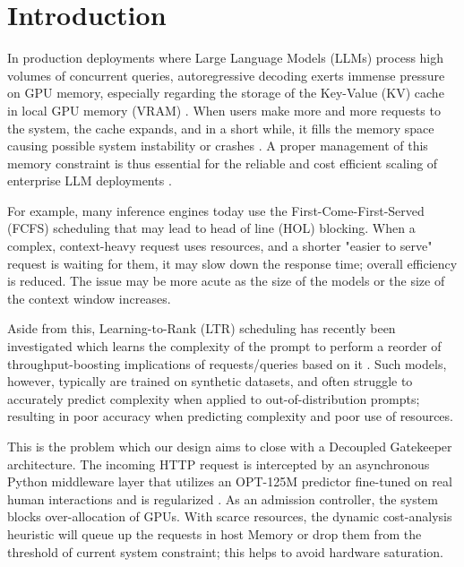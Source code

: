 \documentclass[conference]{IEEEtran}
\begin{document}
\section{Introduction}
In production deployments where Large Language Models (LLMs) process high volumes of concurrent queries, autoregressive decoding exerts immense pressure on GPU memory, especially regarding the storage of the Key-Value (KV) cache in local GPU memory (VRAM) \cite{b1}. When users make more and more requests to the system, the cache expands, and in a short while, it fills the memory space causing possible system instability or crashes \cite{b5}. A proper management of this memory constraint is thus essential for the reliable and cost efficient scaling of enterprise LLM deployments \cite{b11}.


For example, many inference engines today use the First-Come-First-Served (FCFS) scheduling \cite{b4} that may lead to head of line (HOL) blocking. When a complex, context-heavy request uses resources, and a shorter "easier to serve" request is waiting for them, it may slow down the response time; overall efficiency is reduced. The issue may be more acute as the size of the models or the size of the context window increases.


Aside from this, Learning-to-Rank (LTR) scheduling has recently been investigated which learns the complexity of the prompt to perform a reorder of throughput-boosting implications of requests/queries based on it \cite{b7}. Such models, however, typically are trained on synthetic datasets, and often struggle to accurately predict complexity when applied to out-of-distribution prompts; resulting in poor accuracy when predicting complexity and poor use of resources.


This is the problem which our design aims to close with a Decoupled Gatekeeper architecture. The incoming HTTP request is intercepted by an asynchronous Python middleware layer that utilizes an OPT-125M predictor fine-tuned on real human interactions and is regularized \cite{b3}. As an admission controller, the system blocks over-allocation of GPUs. With scarce resources, the dynamic cost-analysis heuristic will queue up the requests in host Memory or drop them from the threshold of current system constraint; this helps to avoid hardware saturation.



\end{document}
